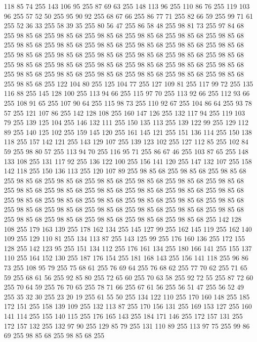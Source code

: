 118 85 74 255 143 106 95 255 87 69 63 255 148 113 96 255 110 86 76 255 119 103 96 255 57 52 50 255 95 90 92 255 68 67 66 255 86 77 71 255 82 66 59 255 99 71 61 255 52 36 33 255 58 39 35 255 80 56 47 255 86 58 48 255 98 81 73 255 97 84 68 255 98 85 68 255 98 85 68 255 98 85 68 255 98 85 68 255 98 85 68 255 98 85 68 255 98 85 68 255 98 85 68 255 98 85 68 255 98 85 68 255 98 85 68 255 98 85 68 255 98 85 68 255 98 85 68 255 98 85 68 255 98 85 68 255 98 85 68 255 98 85 68 255 98 85 68 255 98 85 68 255 98 85 68 255 98 85 68 255 98 85 68 255 98 85 68 255 98 85 68 255 98 85 68 255 98 85 68 255 98 85 68 255 98 85 68 255 98 85 68 255 98 85 68 255 122 104 80 255 125 104 77 255 127 109 81 255 117 99 72 255 135 116 88 255 145 128 100 255 113 94 66 255 115 97 70 255 113 92 66 255 112 93 66 255 108 91 65 255 107 90 64 255 115 98 73 255 110 92 67 255 104 86 64 255
93 78 57 255 121 107 86 255 142 128 108 255 160 147 126 255 132 117 94 255 119 103 79 255 139 125 104 255 146 132 111 255 150 135 113 255 139 122 99 255 129 112 89 255 140 125 102 255 159 145 120 255 161 145 121 255 151 136 114 255 150 138 118 255 157 142 121 255 143 129 107 255 139 123 102 255 127 112 85 255 102 84 59 255 98 80 57 255 113 94 70 255 116 95 71 255 86 67 46 255 103 87 65 255 148 133 108 255 131 117 92 255 136 122 100 255 156 141 120 255 147 132 107 255 158 142 118 255 150 136 113 255 120 107 89 255 98 85 68 255 98 85 68 255 98 85 68 255 98 85 68 255 98 85 68 255 98 85 68 255 98 85 68 255 98 85 68 255 98 85 68 255 98 85 68 255 98 85 68 255 98 85 68 255 98 85 68 255 98 85 68 255 98 85 68 255 98 85 68 255 98 85 68 255 98 85 68 255 98 85 68 255 98 85 68 255 98 85 68 255 98 85 68 255 98 85 68 255 98 85 68 255 98 85 68 255 98 85 68 255 98 85 68 255 98 85 68 255 98 85 68 255 98 85 68 255
98 85 68 255 98 85 68 255 142 128 108 255 179 163 139 255 178 162 134 255 145 127 99 255 162 145 119 255 162 140 109 255 129 110 81 255 134 113 87 255 143 125 99 255 176 160 136 255 172 155 128 255 142 123 95 255 151 134 112 255 176 161 134 255 180 166 141 255 155 137 110 255 164 152 130 255 187 176 154 255 181 168 143 255 156 141 118 255 96 86 73 255 108 95 79 255 75 68 61 255 76 69 64 255 76 68 62 255 77 70 62 255 71 65 59 255 68 61 56 255 92 85 80 255 72 65 60 255 70 63 58 255 92 72 55 255 87 72 60 255 70 64 59 255 76 70 65 255 78 71 66 255 67 61 56 255 56 51 47 255 56 52 49 255 35 32 30 255 23 20 19 255 61 55 50 255 134 122 110 255 170 160 148 255 185 172 151 255 158 139 109 255 132 113 87 255 170 156 131 255 169 153 127 255 160 141 114 255 155 140 115 255 176 165 143 255 184 171 146 255 172 157 131 255 172 157 132 255 132 97 90 255 129 85 79 255 131 110 89 255 113 97 75 255 99 86 69 255 98 85 68 255 98 85 68 255
